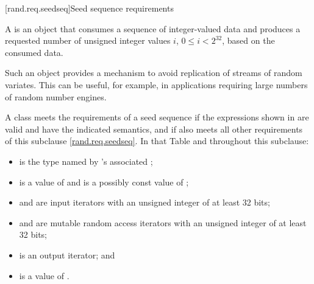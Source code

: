 
[rand.req.seedseq]{Seed sequence requirements}%
%

\pnum
 A 
 is an object
 that consumes a sequence
 of integer-valued data
 and produces a requested number
 of unsigned integer values $i$, $0 \le i < 2^{32}$,
 based on the consumed data.
\begin{note}
 Such an object provides a mechanism
 to avoid replication of streams of random variates.
 This can be useful, for example, in applications
 requiring large numbers of random number engines.
\end{note}

\pnum
A class 
meets the requirements
of a seed sequence
if the expressions shown
in 
are valid and have the indicated semantics,
and if  also meets all other requirements
of this subclause \ref{rand.req.seedseq}.
In that Table and throughout this subclause:
\begin{itemize}
  \item
     is the type named by
    's associated ;
  \item
     is a value of 
    and
     is a possibly const value of ;
  \item
     and  are input iterators
    with an unsigned integer  of at least 32 bits;
  \item
     and  are mutable random access iterators
    with an unsigned integer  of at least 32 bits;
  \item
     is an output iterator;
  and
  \item
     is a value of .
\end{itemize}


